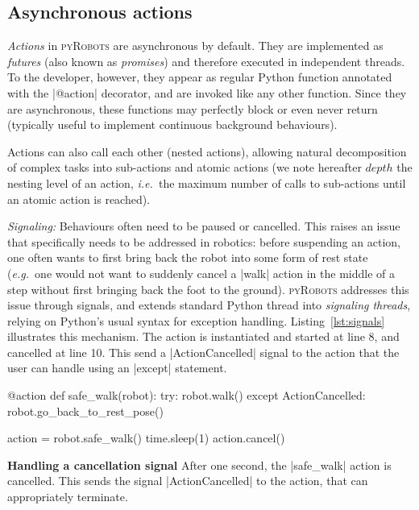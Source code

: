 \documentclass[a4paper, 10pt, conference]{ieeeconf}      %
\newcommand{\ie}{{\textit{i.e.\ }}}
\newcommand{\eg}{{\textit{e.g.\ }}}
\newcommand{\pyRobots}{\textsc{pyRobots}}
\begin{document}
\subsection{Asynchronous actions}

\emph{Actions} in \pyRobots{} are asynchronous by default. They are implemented as
\emph{futures} (also known as \emph{promises}) and therefore executed in
independent threads. To the developer, however, they appear as regular Python
function annotated with the \python|@action| decorator, and are invoked
like any other function.  Since they are asynchronous, these functions may
perfectly block or even never return (typically useful to implement continuous
background behaviours).

Actions can also call each other (nested actions), allowing natural
decomposition of complex tasks into sub-actions and atomic actions (we note
hereafter $depth$ the nesting level of an action, \ie the maximum number of
calls to sub-actions until an atomic action is reached).

\emph{Signaling:} Behaviours often need to be paused or cancelled.  This raises
an issue that specifically needs to be addressed in robotics: before suspending
an action, one often wants to first bring back the robot into some form of rest
state (\eg one would not want to suddenly cancel a \python|walk| action in the
middle of a step without first bringing back the foot to the ground). \pyRobots{}
addresses this issue through signals, and extends standard Python thread into
\emph{signaling threads}, relying on Python's usual syntax for exception
handling. Listing~\ref{lst:signals} illustrates this mechanism. The action is
instantiated and started at line 8, and cancelled at line 10. This send a
\python|ActionCancelled| signal to the action that the user can handle using an
\python|except| statement.

\begin{listing}[H]
\begin{pythoncode}
    @action
    def safe_walk(robot):
      try:
        robot.walk()
      except ActionCancelled:
        robot.go_back_to_rest_pose()

    action = robot.safe_walk()
    time.sleep(1)
    action.cancel()
\end{pythoncode}
\caption{\textbf{Handling a cancellation signal} After one second, the
\python|safe_walk| action is cancelled. This sends the signal
\python|ActionCancelled| to the action, that can appropriately terminate.}
\label{lst:signals}
\end{listing}
\end{document}
